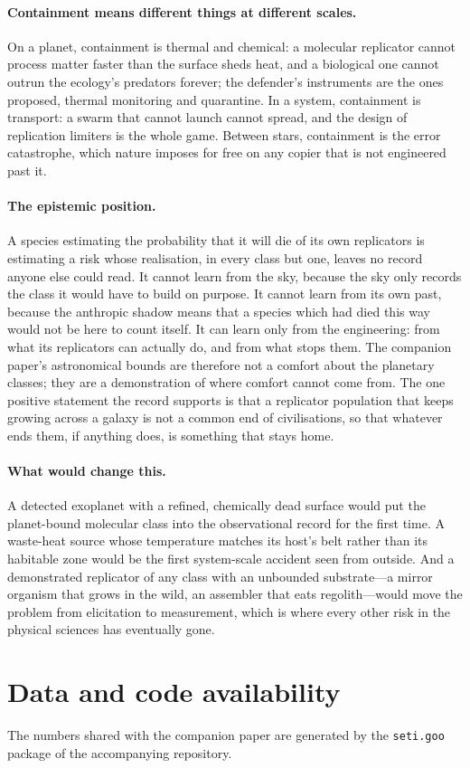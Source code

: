 \documentclass[11pt]{article}
\begin{document}
\paragraph{Containment means different things at different scales.}  On a
planet, containment is thermal and chemical: a molecular replicator cannot
process matter faster than the surface sheds heat, and a biological one
cannot outrun the ecology's predators forever; the defender's instruments are
the ones \citet{Freitas2000} proposed, thermal monitoring and quarantine.  In
a system, containment is transport: a swarm that cannot launch cannot spread,
and the design of replication limiters \citep{Ellery2022b} is the whole
game.  Between stars, containment is the error catastrophe, which nature
imposes for free on any copier that is not engineered past it.

\paragraph{The epistemic position.}  A species estimating the probability
that it will die of its own replicators is estimating a risk whose
realisation, in every class but one, leaves no record anyone else could
read.  It cannot learn from the sky, because the sky only records the class
it would have to build on purpose.  It cannot learn from its own past,
because the anthropic shadow \citep{Cirkovic2010} means that a species which
had died this way would not be here to count itself.  It can learn only from
the engineering: from what its replicators can actually do, and from what
stops them.  The companion paper's astronomical bounds are therefore not a
comfort about the planetary classes; they are a demonstration of where
comfort cannot come from.  The one positive statement the record supports is
that a replicator population that keeps growing across a galaxy is not a
common end of civilisations, so that whatever ends them, if anything does, is
something that stays home.

\paragraph{What would change this.}  A detected exoplanet with a refined,
chemically dead surface would put the planet-bound molecular class into the
observational record for the first time.  A waste-heat source whose
temperature matches its host's belt rather than its habitable zone would be
the first system-scale accident seen from outside.  And a demonstrated
replicator of any class with an unbounded substrate---a mirror organism that
grows in the wild, an assembler that eats regolith---would move the problem
from elicitation to measurement, which is where every other risk in the
physical sciences has eventually gone.

\section*{Data and code availability}
The numbers shared with the companion paper are generated by the
\texttt{seti.goo} package of the accompanying repository.


\end{document}
